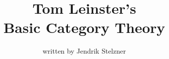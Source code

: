 \documentclass[twoside=semi, open=any]{scrbook}
\title{Tom Leinster’s \\ Basic Category Theory}
\author{written by Jendrik Stelzner}
\begin{document}
\maketitle

\tableofcontents

\renewcommand{\thesection}{Exercise \arabic{chapter}.\arabic{section}}

\setcounter{chapter}{-1}

\end{document}
